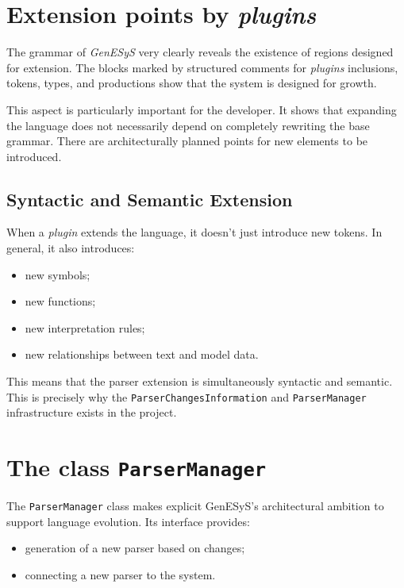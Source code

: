 \section{Extension points by \textit{plugins}}
\label{sec:cap9_pontos_extensao_plugins}

The grammar of \textit{GenESyS} very clearly reveals the existence of regions designed for extension. The blocks marked by structured comments for \textit{plugins} inclusions, tokens, types, and productions show that the system is designed for growth.

This aspect is particularly important for the developer. It shows that expanding the language does not necessarily depend on completely rewriting the base grammar. There are architecturally planned points for new elements to be introduced.

\subsection{Syntactic and Semantic Extension}
\label{subsec:cap9_extensao_sintatica_semantica}

When a \textit{plugin} extends the language, it doesn't just introduce new tokens. In general, it also introduces:
\begin{itemize}
 \item new symbols;
 \item new functions;
 \item new interpretation rules;
 \item new relationships between text and model data.
\end{itemize}

This means that the parser extension is simultaneously syntactic and semantic. This is precisely why the \texttt{ParserChangesInformation} and \texttt{ParserManager} infrastructure exists in the project.

\section{The class \texttt{ParserManager}}
\label{sec:cap9_classe_parsermanager}

The \texttt{ParserManager} class makes explicit GenESyS's architectural ambition to support language evolution. Its interface provides:
\begin{itemize}
 \item generation of a new parser based on changes;
 \item connecting a new parser to the system.
\end{itemize}

